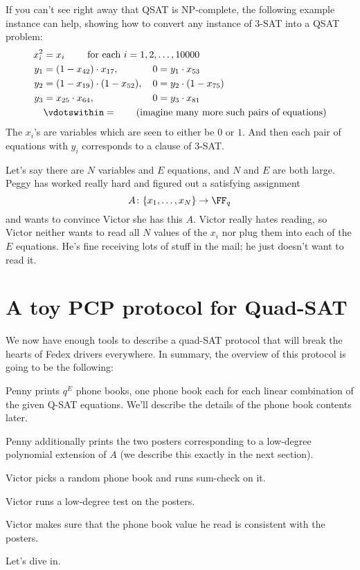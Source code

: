 \documentclass[11pt]{scrreprt}
\begin{document}
\begin{remark*}
  If you can't see right away that QSAT is NP-complete,
  the following example instance can help,
  showing how to convert any instance of 3-SAT into a QSAT problem:
  \begin{align*}
    x_i^2 &= x_i \qquad \text{ for each } i=1,2,\dots,10000 \\
    y_1 &= (1-x_{42}) \cdot x_{17}, \hspace{3.5em} 0 = y_1 \cdot x_{53} \\
    y_2 &= (1-x_{19}) \cdot (1-x_{52}), \hspace{1em} 0 = y_2 \cdot (1-x_{75}) \\
    y_3 &= x_{25} \cdot x_{64}, \hspace{6em} 0 = y_3 \cdot x_{81} \\
    &\vdotswithin= \qquad\text{(imagine many more such pairs of equations)}
  \end{align*}
  The $x_i$'s are variables which are seen to either be $0$ or $1$.
  And then each pair of equations with $y_i$ corresponds to a clause of 3-SAT.
\end{remark*}

Let's say there are $N$ variables and $E$ equations, and $N$ and $E$ are both large.
Peggy has worked really hard and figured out a satisfying assignment
\[ A \colon \{x_1, \dots, x_N\} \to \FF_q \]
and wants to convince Victor she has this $A$.
Victor really hates reading,
so Victor neither wants to read all $N$ values of the $x_i$
nor plug them into each of the $E$ equations.
He's fine receiving lots of stuff in the mail; he just doesn't want to read it.

\section{A toy PCP protocol for Quad-SAT}
We now have enough tools to describe a quad-SAT protocol that will break
the hearts of Fedex drivers everywhere.
In summary, the overview of this protocol is going to be the following:
\begin{itemize}
  \ii Penny prints $q^E$ phone books, one phone book each for each linear combination
  of the given Q-SAT equations.
  We'll describe the details of the phone book contents later.

  \ii Penny additionally prints the two posters corresponding
  to a low-degree polynomial extension of $A$
  (we describe this exactly in the next section).

  \ii Victor picks a random phone book and runs sum-check on it.

  \ii Victor runs a low-degree test on the posters.

  \ii Victor makes sure that the phone book value he read is consistent with the posters.
\end{itemize}
Let's dive in.
\end{document}
